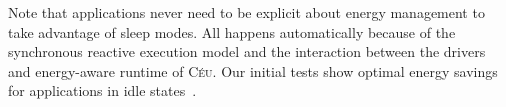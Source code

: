 \documentclass[sigplan,10pt,review,anonymous]{acmart}\settopmatter{printfolios=true,printccs=false,printacmref=false}
\newcommand{\CEU}{\textsc{C\'{e}u}\xspace}
\begin{document}
Note that applications never need to be explicit about energy management to take
advantage of sleep modes.
All happens automatically because of the synchronous reactive execution model
and the interaction between the drivers and energy-aware runtime of \CEU.
%
Our initial tests show optimal energy savings for applications in idle
states~\cite{ceu.lctes18.short}.

\end{document}
